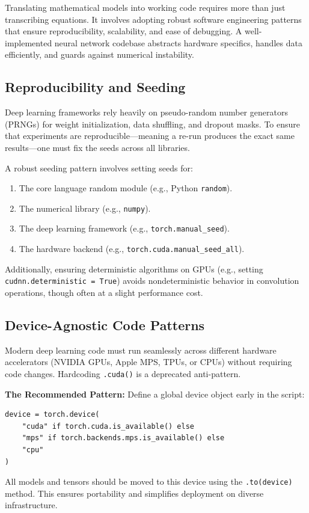 \documentclass[12pt,a4paper]{report}
\begin{document}
Translating mathematical models into working code requires more than just transcribing equations. It involves adopting robust software engineering patterns that ensure reproducibility, scalability, and ease of debugging. A well-implemented neural network codebase abstracts hardware specifics, handles data efficiently, and guards against numerical instability.

\subsection{Reproducibility and Seeding}
Deep learning frameworks rely heavily on pseudo-random number generators (PRNGs) for weight initialization, data shuffling, and dropout masks. To ensure that experiments are reproducible—meaning a re-run produces the exact same results—one must fix the seeds across all libraries.

A robust seeding pattern involves setting seeds for:
\begin{enumerate}
    \item The core language random module (e.g., Python \texttt{random}).
    \item The numerical library (e.g., \texttt{numpy}).
    \item The deep learning framework (e.g., \texttt{torch.manual\_seed}).
    \item The hardware backend (e.g., \texttt{torch.cuda.manual\_seed\_all}).
\end{enumerate}

Additionally, ensuring deterministic algorithms on GPUs (e.g., setting \texttt{cudnn.deterministic = True}) avoids nondeterministic behavior in convolution operations, though often at a slight performance cost.

\subsection{Device-Agnostic Code Patterns}
Modern deep learning code must run seamlessly across different hardware accelerators (NVIDIA GPUs, Apple MPS, TPUs, or CPUs) without requiring code changes. Hardcoding \texttt{.cuda()} is a deprecated anti-pattern.

\textbf{The Recommended Pattern:}
Define a global device object early in the script:
\begin{verbatim}
device = torch.device(
    "cuda" if torch.cuda.is_available() else
    "mps" if torch.backends.mps.is_available() else
    "cpu"
)
\end{verbatim}
All models and tensors should be moved to this device using the \texttt{.to(device)} method. This ensures portability and simplifies deployment on diverse infrastructure.
\end{document}
